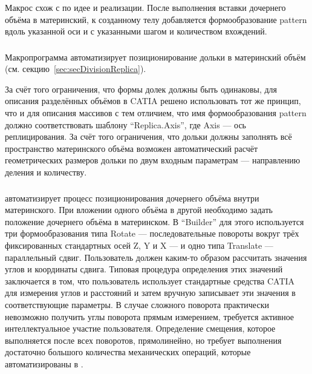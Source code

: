 
Макрос  схож с  по идее и реализации. После выполнения вставки дочернего объёма в материнский, к созданному телу добавляется формообразование pattern вдоль указанной оси и с указанными шагом и количеством вхождений.

\subsubsection{}\label{sec:secMacroReplica}

Макропрограмма  автоматизирует позиционирование дольки в материнский объём (см. секцию~\ref{sec:secDivisionReplica}).

За счёт того ограничения, что формы долек должны быть одинаковы, для описания разделённых объёмов в CATIA решено использовать тот же принцип, что и для описания массивов с тем отличием, что имя формообразования pattern должно соответствовать шаблону ``Replica.Axis'', где Axis --- ось реплицирования. За счёт того ограничения, что дольки должны заполнять всё пространство материнского объёма возможен автоматический расчёт геометрических размеров дольки по двум входным параметрам --- направлению деления и количеству.

\bigskip

\subsubsection{}\label{sec:secMacroPtPAligner}

 автоматизирует процесс позиционирования дочернего объёма внутри материнского. При вложении одного объёма в другой необходимо задать положение дочернего объёма в материнском. В ``Builder'' для этого используется три формообразования типа Rotate --- последовательные повороты вокруг трёх фиксированных стандартных осей Z, Y и X --- и одно типа Translate --- параллельный сдвиг. Пользователь должен каким-то образом рассчитать значения углов и координаты сдвига. Типовая процедура определения этих значений заключается в том, что пользователь использует стандартные средства CATIA для измерения углов и расстояний и затем вручную записывает эти значения в соответствующие параметры. В случае сложного поворота практически невозможно получить углы поворота прямым измерением, требуется активное интеллектуальное участие пользователя. Определение смещения, которое выполняется после всех поворотов, прямолинейно, но требует выполнения достаточно большого количества механических операций, которые автоматизированы в .

